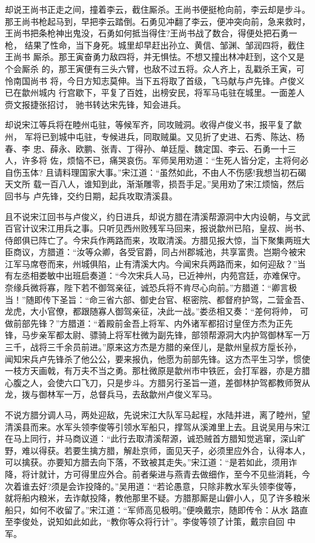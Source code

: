 却说王尚书正走之间，撞着李云，截住厮杀。王尚书便挺枪向前，李云却是步斗。
那王尚书枪起马到，早把李云踏倒。石勇见冲翻了李云，便冲突向前，急来救时，
王尚书把条枪神出鬼没，石勇如何抵当得住?王尚书战了数合，得便处把石勇一枪，
结果了性命，当下身死。城里却早赶出孙立、黄信、邹渊、邹润四将，截住王尚书
厮杀。那王寅奋勇力敌四将，并无惧怯。不想又撞出林冲赶到，这个又是个会厮杀
的，那王寅便有三头六臂，也敌不过五将。众人齐上，乱戳杀王寅，可怜南国尚书
将，今日方知志莫伸。当下五将取了首级，飞马献与卢先锋。卢俊义已在歙州城内
行宫歇下，平复了百姓，出榜安民，将军马屯驻在城里。一面差人赍文报捷张招讨，
驰书转达宋先锋，知会进兵。

却说宋江等兵将在睦州屯驻，等候军齐，同攻贼洞。收得卢俊义书，报平复了歙州，
军将已到城中屯驻，专候进兵，同取贼巢。又见折了史进、石秀、陈达、杨春、李
忠、薛永、欧鹏、张青、丁得孙、单廷垕、魏定国、李云、石勇一十三人，许多将
佐，烦恼不已，痛哭哀伤。军师吴用劝道：“生死人皆分定，主将何必自伤玉体?
且请料理国家大事。”宋江道：“虽然如此，不由人不伤感!我想当初石碣天文所
载一百八人，谁知到此，渐渐雕零，损吾手足。”吴用劝了宋江烦恼，然后回书与
卢先锋，交约日期，起兵攻取清溪县。

且不说宋江回书与卢俊义，约日进兵，却说方腊在清溪帮源洞中大内设朝，与文武
百官计议宋江用兵之事。只听见西州败残军马回来，报说歙州已陷，皇叔、尚书、
侍郎俱已阵亡了。今宋兵作两路而来，攻取清溪。方腊见报大惊，当下聚集两班大
臣商议，方腊道：“汝等众卿，各受官爵，同占州郡城池，共享富贵。岂期今被宋
江军马席卷而来，州城俱陷，止有清溪大内。今闻宋兵两路而来，如何迎敌？”当
有左丞相娄敏中出班启奏道：“今次宋兵人马，已近神州，内苑宫廷，亦难保守。
奈缘兵微将寡，陛下若不御驾亲征，诚恐兵将不肯尽心向前。”方腊道：“卿言极
当！”随即传下圣旨：“命三省六部、御史台官、枢密院、都督府护驾，二营金吾、
龙虎，大小官僚，都跟随寡人御驾亲征，决此一战。”娄丞相又奏：“差何将帅，
可做前部先锋？”方腊道：“着殿前金吾上将军、内外诸军都招讨皇侄方杰为正先
锋，马步亲军都太尉、骠骑上将军杜微为副先锋，部领帮源洞大内护驾御林军一万
三千，战将三千余员前进。”原来这方杰是方腊的亲侄儿，是歙州皇叔方垕长孙，
闻知宋兵卢先锋杀了他公公，要来报仇，他愿为前部先锋。这方杰平生习学，惯使
一枝方天画戟，有万夫不当之勇。那杜微原是歙州市中铁匠，会打军器，亦是方腊
心腹之人，会使六口飞刀，只是步斗。方腊另行圣旨一道，差御林护驾都教师贺从
龙，拨与御林军一万，总督兵马，去敌歙州卢俊义军马。

不说方腊分调人马，两处迎敌，先说宋江大队军马起程，水陆并进，离了睦州，望
清溪县而来。水军头领李俊等引领水军船只，撑驾从溪滩里上去。且说吴用与宋江
在马上同行，并马商议道：“此行去取清溪帮源，诚恐贼首方腊知觉逃窜，深山旷
野，难以得获。若要生擒方腊，解赴京师，面见天子，必须里应外合，认得本人，
可以擒获。亦要知方腊去向下落，不致被其走失。”宋江道：“是若如此，须用诈
降，将计就计，方可得里应外合。前者柴进与燕青去做细作，至今不见些消耗，今
次着谁去好?须是会诈投降的。”吴用道：“若论愚意，只除非教水军头领李俊等，
就将船内粮米，去诈献投降，教他那里不疑。方腊那厮是山僻小人，见了许多粮米
船只，如何不收留了。”宋江道：“军师高见极明。”便唤戴宗，随即传令：从水
路直至李俊处，说知如此如此，“教你等众将行计”。李俊等领了计策，戴宗自回
中军。

